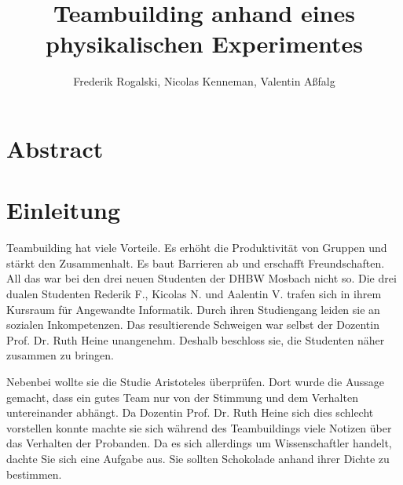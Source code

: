 \documentclass[12pt]{scrartcl}
\title{Teambuilding anhand eines physikalischen Experimentes}
\author{Frederik Rogalski, Nicolas Kenneman, Valentin Aßfalg}
\begin{document}
\maketitle

\section{Abstract}

\section{Einleitung}
Teambuilding hat viele Vorteile. Es erhöht die Produktivität von Gruppen und stärkt den Zusammenhalt. Es baut Barrieren ab und erschafft Freundschaften. All das war bei den drei neuen Studenten der DHBW Mosbach nicht so. Die drei dualen Studenten Rederik F., Kicolas N. und Aalentin V. trafen sich in ihrem Kursraum für Angewandte Informatik. Durch ihren Studiengang leiden sie an sozialen Inkompetenzen. Das resultierende Schweigen war selbst der Dozentin Prof. Dr. Ruth Heine unangenehm. Deshalb beschloss sie, die Studenten näher zusammen zu bringen. 

Nebenbei wollte sie die Studie Aristoteles \cite{Aristoteles} überprüfen. Dort wurde die Aussage gemacht, dass ein gutes Team nur von der Stimmung und dem Verhalten untereinander abhängt. Da Dozentin Prof. Dr. Ruth Heine sich dies schlecht vorstellen konnte machte sie sich während des Teambuildings viele Notizen über das Verhalten der Probanden. Da es sich allerdings um Wissenschaftler handelt, dachte Sie sich eine Aufgabe aus. Sie sollten Schokolade anhand ihrer Dichte zu bestimmen.
\end{document}
